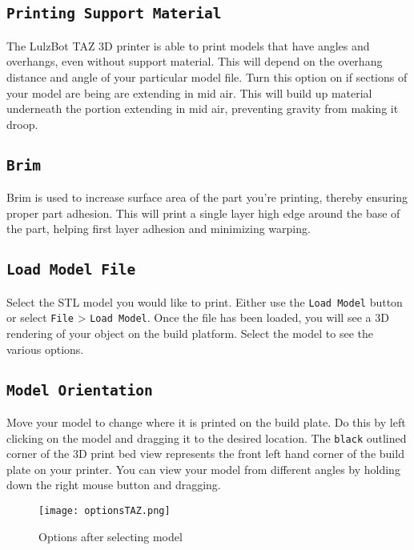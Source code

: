 \subsection{\texttt{Printing Support Material}}
The LulzBot TAZ 3D printer is able to print models that have angles and overhangs, even without support material. This will depend on the overhang distance and angle of your particular model file. Turn this option on if sections of your model are being are extending in mid air. This will build up material underneath the portion extending in mid air, preventing gravity from making it droop.

\subsection{\texttt{Brim}}
Brim is used to increase surface area of the part you're printing, thereby ensuring proper part adhesion. This will print a single layer high edge around the base of the part, helping first layer adhesion and minimizing warping.

\subsection{\texttt{Load Model File}}
Select the STL model you would like to print. Either use the \texttt{Load Model} button or select \texttt{File} > \texttt{Load Model}. Once the file has been loaded, you will see a 3D rendering of your object on the build platform. Select the model to see the various options. 

\subsection{\texttt{Model Orientation}}
Move your model to change where it is printed on the build plate. Do this by left clicking on the model and dragging it to the desired location. The \texttt{black} outlined corner of the 3D print bed view represents the front left hand corner of the build plate on your printer. You can view your model from different angles by holding down the right mouse button and dragging. %
\begin{figure}[H]
\centering
\texttt{[image: optionsTAZ.png]}
\caption{Options after selecting model}
\label{fig:Orientation}
\end{figure}

